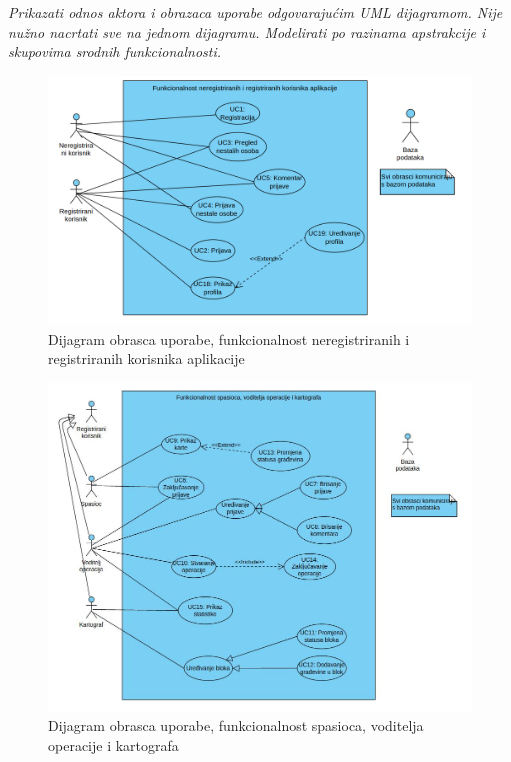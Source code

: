 					\textit{Prikazati odnos aktora i obrazaca uporabe odgovarajućim UML dijagramom. Nije nužno nacrtati sve na jednom dijagramu. Modelirati po razinama apstrakcije i skupovima srodnih funkcionalnosti.}
					
					
					\begin{figure}[H]      \includegraphics[width=\linewidth]{dijagrami/UML1.vpd.jpg}
					\caption{Dijagram obrasca uporabe, funkcionalnost neregistriranih i registriranih korisnika aplikacije}
	                \end{figure}
	                
				    \begin{figure}[h!] \includegraphics[width=\linewidth]{dijagrami/UML2.vpd.jpg}
				    \caption{Dijagram obrasca uporabe, funkcionalnost spasioca, voditelja operacije i kartografa}
				    \end{figure}
				    
